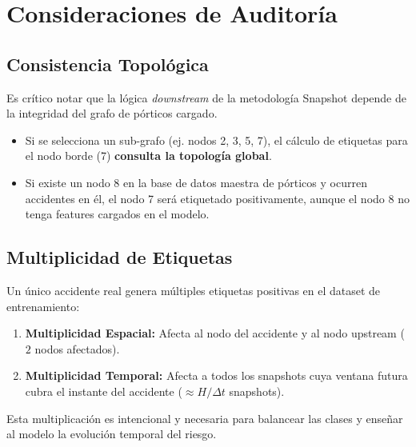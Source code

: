 \documentclass[11pt, letterpaper]{article}
\begin{document}
\section{Consideraciones de Auditoría}

\subsection{Consistencia Topológica}
Es crítico notar que la lógica \textit{downstream} de la metodología Snapshot depende de la integridad del grafo de pórticos cargado.
\begin{itemize}
    \item Si se selecciona un sub-grafo (ej. nodos 2, 3, 5, 7), el cálculo de etiquetas para el nodo borde (7) \textbf{consulta la topología global}.
    \item Si existe un nodo 8 en la base de datos maestra de pórticos y ocurren accidentes en él, el nodo 7 será etiquetado positivamente, aunque el nodo 8 no tenga features cargados en el modelo.
\end{itemize}

\subsection{Multiplicidad de Etiquetas}
Un único accidente real genera múltiples etiquetas positivas en el dataset de entrenamiento:
\begin{enumerate}
    \item \textbf{Multiplicidad Espacial:} Afecta al nodo del accidente y al nodo upstream ($2$ nodos afectados).
    \item \textbf{Multiplicidad Temporal:} Afecta a todos los snapshots cuya ventana futura cubra el instante del accidente ($\approx H / \Delta t$ snapshots).
\end{enumerate}
Esta multiplicación es intencional y necesaria para balancear las clases y enseñar al modelo la evolución temporal del riesgo.
\end{document}
